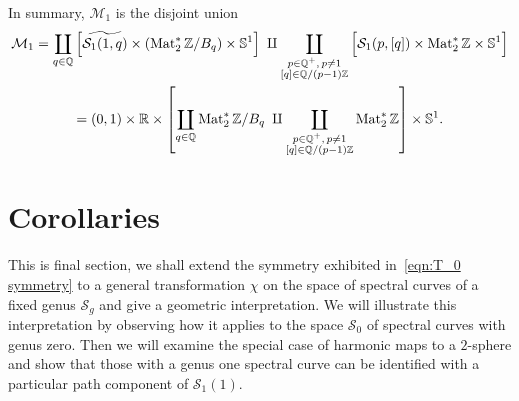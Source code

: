 \documentclass{article}
\begin{document}
In summary, $\mathcal{M}_1$ is the disjoint union
\begin{gather*}
\mathcal{M}_1
=
\coprod_{q \in \mathbb{Q}} \Big[ \widetilde{\mathcal{S}_1(1,q)} \times \left(\operatorname{Mat}_2^*\mathbb{Z} / B_q\right) \times \mathbb{S}^1 \Big]
\;\amalg
\coprod_{\substack{p \in \mathbb{Q}^+,\, p \neq 1\\ [q] \in \mathbb{Q}/(p-1)\mathbb{Z}}} \Big[ \mathcal{S}_1(p,[q]) \times \operatorname{Mat}_2^*\mathbb{Z} \times \mathbb{S}^1 \Big] \\
=
(0,1)\times\mathbb{R} \times \left[
\coprod_{q \in \mathbb{Q}} \operatorname{Mat}_2^*\mathbb{Z} / B_q
\;\amalg
\coprod_{\substack{p \in \mathbb{Q}^+,\, p \neq 1\\ [q] \in \mathbb{Q}/(p-1)\mathbb{Z}}} \operatorname{Mat}_2^*\mathbb{Z}
\right] \times \mathbb{S}^1.
\end{gather*}











\section{Corollaries}\label{sec:Corollaries}

This is final section, we shall extend the symmetry exhibited in~\eqref{eqn:T_0 symmetry} to a general transformation $\chi$ on the space of spectral curves of a fixed genus $\mathcal{S}_g$ and give a geometric interpretation. We will illustrate this interpretation by observing how it applies to the space $\mathcal{S}_0$ of spectral curves with genus zero. 
Then we will examine the special case of harmonic maps to a $2$-sphere and show that those with a genus one spectral curve can be identified with a particular path component of $\mathcal{S}_1(1)$.
\end{document}
